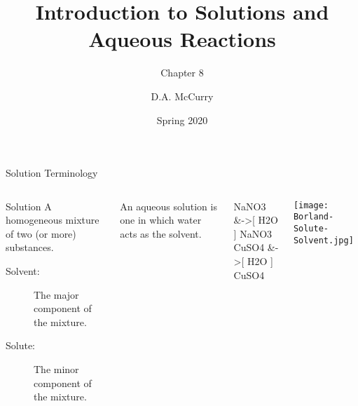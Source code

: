 \documentclass[11pt,letterpaper]{article}
\title{Introduction to Solutions and Aqueous Reactions}
\subtitle{Chapter 8}
\institute[CHEM115 Bloomsburg University]{CHEM115 --- Chemistry for the Sciences I \\ Bloomsburg University}
\author{D.A. McCurry}
\date{Spring 2020}
\begin{document}
\maketitle
{}



\begin{frame}{Solution Terminology}
	\begin{columns}
		\begin{block}{Solution}
			A homogeneous mixture of two (or more) substances.
			\begin{description}
				\item[Solvent:] The major component of the mixture.
				\item[Solute:] The minor component of the mixture.
			\end{description}
		\end{block}
		An \alert{aqueous solution} is one in which water acts as the
		solvent.
		\begin{reactions*}
			NaNO3\sld{} &->[ H2O ] NaNO3\aq{} \\
			CuSO4\sld{} &->[ H2O ] CuSO4\aq{}
		\end{reactions*}
		\begin{center}
			\texttt{[image: Borland-Solute-Solvent.jpg]}
		\end{center}
	\end{columns}


%
\end{frame}
\end{document}
